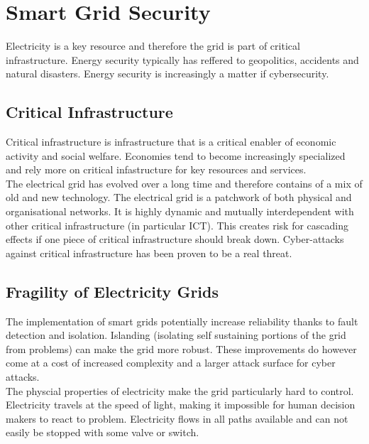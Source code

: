 \section{Smart Grid Security}
Electricity is a key resource and therefore the grid is part of critical infrastructure.
Energy security typically has reffered to geopolitics, accidents and natural disasters.
Energy security is increasingly a matter if cybersecurity.

\subsection{Critical Infrastructure}
Critical infrastructure is infrastructure that is a critical enabler of economic activity and social welfare.
Economies tend to become increasingly specialized and rely more on critical infastructure for key resources and services.\\

The electrical grid has evolved over a long time and therefore contains of a mix of old and new technology.
The electrical grid is a patchwork of both physical and organisational networks.
It is highly dynamic and mutually interdependent with other critical infrastructure (in particular ICT).
This creates risk for cascading effects if one piece of critical infrastructure should break down.
Cyber-attacks against critical infrastructure has been proven to be a real threat.

\subsection{Fragility of Electricity Grids}
The implementation of smart grids potentially increase reliability thanks to fault detection and isolation.
Islanding (isolating self sustaining portions of the grid from problems) can make the grid more robust.
These improvements do however come at a cost of increased complexity and a larger attack surface for cyber attacks.\\

The physcial properties of electricity make the grid particularly hard to control.
Electricity travels at the speed of light, making it impossible for human decision makers to react to problem.
Electricity flows in all paths available and can not easily be stopped with some valve or switch.\\

